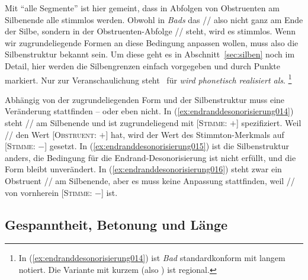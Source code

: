 
Mit "`alle Segmente"' ist hier gemeint, dass in Abfolgen von Obstruenten am Silbenende alle stimmlos werden.
Obwohl in \textit{Bads} das // also nicht ganz am Ende der Silbe, sondern in der Obstruenten-Abfolge // steht, wird es stimmlos.
Wenn wir zugrundeliegende Formen an diese Bedingung anpassen wollen, muss also die Silbenstruktur bekannt sein.
Um diese geht es in Abschnitt~\ref{sec:silben} noch im Detail, hier werden die Silbengrenzen einfach vorgegeben und durch Punkte markiert.
Nur zur Veranschaulichung steht \phopro\ für \textit{wird phonetisch  realisiert als}.%
\footnote{In (\ref{ex:endranddesonorisierung014}) ist \textit{Bad} standardkonform mit langem \textipa{[a:]} notiert.
Die Variante mit kurzem \textipa{[a]} (also \textipa{[bat]}) ist regional.}

\begin{exe}
  \ex\label{ex:endranddesonorisierung013}
  \begin{xlist}
  \end{xlist}
\end{exe}

Abhängig von der zugrundeliegenden Form und der Silbenstruktur muss eine Veränderung stattfinden -- oder eben nicht.
In (\ref{ex:endranddesonorisierung014}) steht // am Silbenende und ist zugrundeliegend mit [\textsc{Stimme}: $+$] spezifiziert.
Weil // den Wert [\textsc{Obstruent}: $+$] hat, wird der Wert des Stimmton-Merkmals auf [\textsc{Stimme}: $-$] gesetzt.
In (\ref{ex:endranddesonorisierung015}) ist die Silbenstruktur anders, die Bedingung für die Endrand-Desonorisierung ist nicht erfüllt, und die Form bleibt unverändert.
In (\ref{ex:endranddesonorisierung016}) steht zwar ein Obstruent // am Silbenende, aber es muss keine Anpassung stattfinden, weil // von vornherein [\textsc{Stimme}: $-$] ist.

\subsection{Gespanntheit, Betonung und Länge}
\label{sec:gespanntheitbetonungundlaenge}

